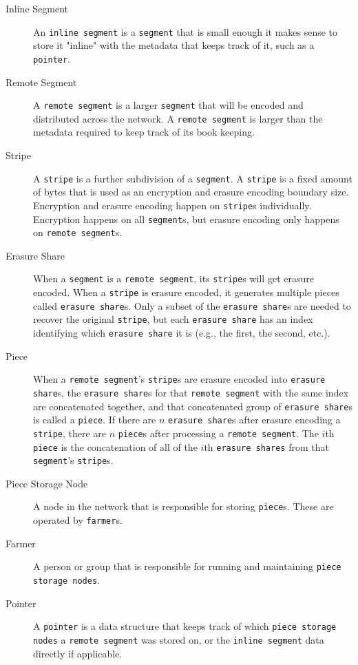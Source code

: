 \documentclass[a4paper,10pt]{article}
\newcommand{\x}[1]{{\tt #1}}
\begin{document}
\begin{description}
\item[Inline Segment] An \x{inline segment} is a \x{segment} that is small
enough it makes sense to store it "inline" with the metadata that keeps track of
it, such as a \x{pointer}.

\item[Remote Segment] A \x{remote segment} is a larger \x{segment} that will be
encoded and distributed across the network. A \x{remote segment} is larger than
the metadata required to keep track of its book keeping.

\item[Stripe] A \x{stripe} is a further subdivision of a \x{segment}. A \x{stripe}
is a fixed amount of bytes that is used as an encryption and erasure encoding
boundary size. Encryption and erasure encoding happen on \x{stripe}s
individually. Encryption happens on all \x{segment}s, but erasure encoding only
happens on \x{remote segment}s.

\item[Erasure Share] When a \x{segment} is a \x{remote segment}, its \x{stripe}s
will get erasure encoded. When a \x{stripe} is erasure encoded, it generates
multiple pieces called \x{erasure share}s. Only a subset of the
\x{erasure share}s are needed to recover the original \x{stripe}, but each
\x{erasure share} has an index identifying which \x{erasure share} it is (e.g.,
the first, the second, etc.).

\item[Piece] When a \x{remote segment}'s \x{stripe}s are erasure encoded into
\x{erasure share}s, the \x{erasure share}s for that \x{remote segment} with the
same index are concatenated together, and that concatenated group of
\x{erasure share}s is called a \x{piece}. If there are $n$ \x{erasure share}s
after erasure encoding a \x{stripe}, there are $n$ \x{piece}s after processing
a \x{remote segment}. The $i$th \x{piece} is the concatenation of all of the
$i$th \x{erasure shares} from that \x{segment}'s \x{stripe}s.

\item[Piece Storage Node] A node in the network that is responsible for storing
\x{piece}s. These are operated by \x{farmer}s.

\item[Farmer] A person or group that is responsible for running and maintaining
\x{piece storage nodes}.

\item[Pointer] A \x{pointer} is a data structure that keeps track of which
\x{piece storage nodes} a \x{remote segment} was stored on, or the
\x{inline segment} data directly if applicable.

\end{description}
\end{document}
